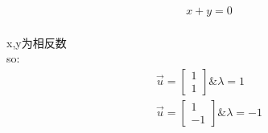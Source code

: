 \documentclass[12pt]{article}
\begin{document}
\begin{flushleft}
\begin{align}
        x + y = 0
    \end{align} \\
    x,y为相反数 \\
    so: \\
    \begin{align}
        \vec{u} =  \begin{bmatrix}
                       1 \\
                       1
                   \end{bmatrix} \& \lambda = 1 \\
        \vec{u} =  \begin{bmatrix}
                       1 \\
                       -1
                   \end{bmatrix} \& \lambda = -1
    \end{align}
\end{flushleft}
\end{document}
